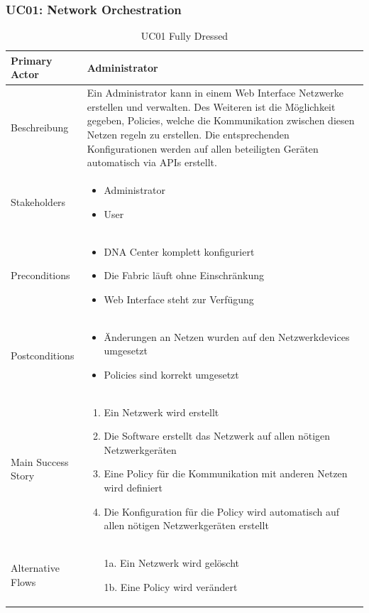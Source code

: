 \subsubsection{UC01: Network Orchestration}
\begin{table}[H]
	\centering
	\begin{tabularx}{\textwidth}{l | X}
		Primary Actor      & Administrator        \\
		\hline
		Beschreibung       & Ein Administrator kann in einem Web Interface Netzwerke erstellen und verwalten. Des Weiteren ist die Möglichkeit gegeben, Policies, welche die Kommunikation zwischen diesen Netzen regeln zu erstellen. Die entsprechenden Konfigurationen werden auf allen beteiligten Geräten automatisch via APIs erstellt. \\ 
		\hline
		Stakeholders       &  
		\begin{itemize}	
			\item Administrator
			\item User
		\end{itemize}              \\
		\hline
		Preconditions      & 
		\begin{itemize}	
			\item DNA Center komplett konfiguriert
			\item Die Fabric läuft ohne Einschränkung
			\item Web Interface steht zur Verfügung
		\end{itemize}  \\
		\hline
		Postconditions     & 
		\begin{itemize}	
			\item Änderungen an Netzen wurden auf den Netzwerkdevices umgesetzt
			\item Policies sind korrekt umgesetzt
		\end{itemize}  \\
		\hline
		Main Success Story & 
		\begin{enumerate}
			\item Ein Netzwerk wird erstellt
			\item Die Software erstellt das Netzwerk auf allen nötigen Netzwerkgeräten
			\item Eine Policy für die Kommunikation mit anderen Netzen wird definiert
			\item Die Konfiguration für die Policy wird automatisch auf allen nötigen Netzwerkgeräten erstellt
		\end{enumerate}
		\\
		\hline
		Alternative Flows  & 
		\begin{itemize}
			\item[1a.] Ein Netzwerk wird gelöscht
			\item[1b.] Eine Policy wird verändert
		\end{itemize}
	\end{tabularx}
	\caption{UC01 Fully Dressed}
	\label{tab:UC01}
\end{table}

